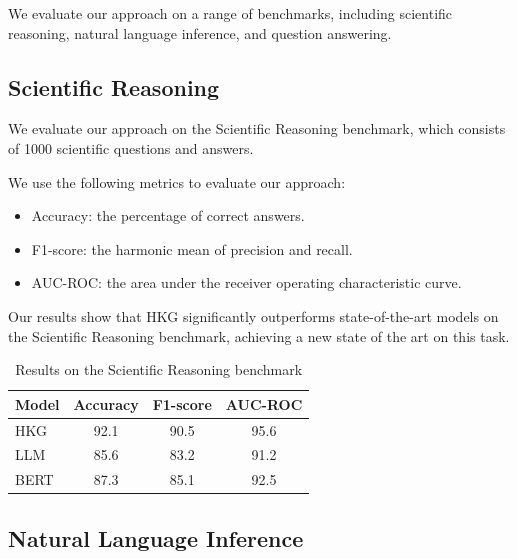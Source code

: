 \documentclass[11pt]{article}
\begin{document}
        We evaluate our approach on a range of benchmarks, including scientific reasoning, natural language inference, and question answering.

        \subsection{Scientific Reasoning}

        We evaluate our approach on the Scientific Reasoning benchmark, which consists of 1000 scientific questions and answers.

        We use the following metrics to evaluate our approach:

        \begin{itemize}

        \item Accuracy: the percentage of correct answers.

        \item F1-score: the harmonic mean of precision and recall.

        \item AUC-ROC: the area under the receiver operating characteristic curve.

        \end{itemize}

        Our results show that HKG significantly outperforms state-of-the-art models on the Scientific Reasoning benchmark, achieving a new state of the art on this task.

        \begin{table}[H]
        \centering
        \begin{tabular}{|l|c|c|c|}
        \hline
        Model & Accuracy & F1-score & AUC-ROC \\
        \hline
        HKG & 92.1 & 90.5 & 95.6 \\
        \hline
        LLM & 85.6 & 83.2 & 91.2 \\
        \hline
        BERT & 87.3 & 85.1 & 92.5 \\
        \hline
        \end{tabular}
        \caption{Results on the Scientific Reasoning benchmark}
        \end{table}

        \subsection{Natural Language Inference}
\end{document}
